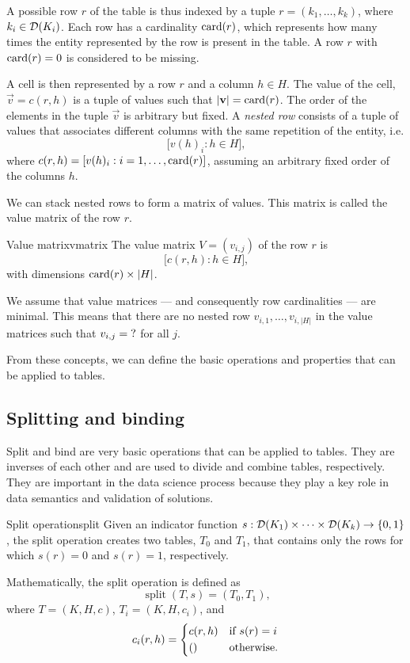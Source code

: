 A possible row $r$ of the table is thus indexed by a tuple $r = (k_1, \dots,
k_k)$, where $k_i \in \domainof{K_i}$.  Each row has a cardinality $\rowcard[r]$, which
represents how many times the entity represented by the row is present in the table.
A row $r$ with $\rowcard[r] = 0$ is considered to be missing.

A cell is then represented by a row $r$ and a column $h \in H$.  The value of the cell,
$\vec{v} = c(r, h)$ is a tuple of values such that $|\vec{v}| = \rowcard[r]$.
The order of the elements in the tuple $\vec{v}$ is arbitrary but fixed.  A \emph{nested
row} consists of a tuple of values that associates different columns with the same
repetition of the entity, i.e. \[
  \Big[ v(h)_i : h \in H \Big]\text{,}
\]
where $c(r, h) = [v(h)_i : i = 1, \dots, \rowcard[r]]$, assuming an arbitrary fixed order
of the columns $h$.

We can stack nested rows to form a matrix of values.  This matrix is called the value
matrix of the row $r$.

\begin{defbox}{Value matrix}{vmatrix}
The value matrix $V = (v_{i, j})$ of the row $r$ is \[
  \Big[ c(r, h) : h \in H \Big]\text{,}
\] with dimensions $\rowcard[r] \times |H|$.
\end{defbox}

We assume that value matrices --- and consequently row cardinalities --- are minimal. This
means that there are no nested row $v_{i, 1}, \dots, v_{i, |H|}$ in the value matrices
such that $v_{i, j} = \missing$ for all $j$.

From these concepts, we can define the basic operations and properties that can be applied
to tables.

\subsection{Splitting and binding}

Split and bind are very basic operations that can be applied to tables.  They are
inverses of each other and are used to divide and combine tables, respectively.
They are important in the data science process because they play a key role in
data semantics and validation of solutions.

\begin{defbox}{Split operation}{split}
Given an indicator function $s : \domainof{K_1} \times \dots \times \domainof{K_k} \to
\left\{0, 1\right\}$, the split operation creates two tables, $T_0$ and $T_1$, that
contains only the rows for which
$s(r) = 0$ and $s(r) = 1$, respectively.

Mathematically, the split operation is defined as \[
  \operatorname{split}(T, s) = \left(T_0, T_1\right)\text{,}
\] where $T = (K, H, c)$, $T_i = (K, H, c_i)$, and \[
  c_i(r, h) = \begin{dcases}
    c(r, h) & \text{if } s(r) = i \\
    () & \text{otherwise.}
  \end{dcases}
\]
\end{defbox}

